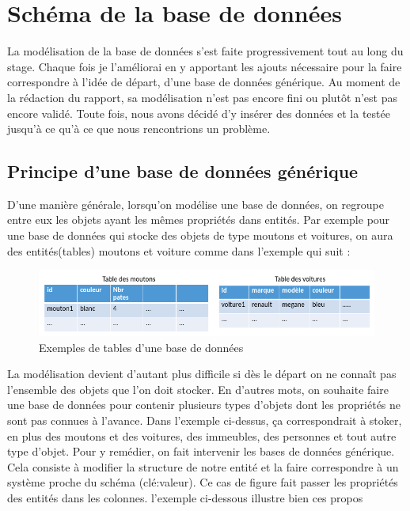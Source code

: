 \section{Schéma de la base de données}
La modélisation de la base de données s'est faite progressivement tout au long du stage. Chaque fois je l'améliorai en y apportant les ajouts nécessaire pour la faire correspondre à l'idée de départ, d'une base de données générique. Au moment de la rédaction du rapport, sa modélisation n'est pas encore fini ou plutôt n'est pas encore validé. Toute fois, nous avons décidé d'y insérer des données et la testée jusqu'à ce qu'à ce que nous rencontrions un problème.
\subsection{Principe d'une base de données générique}
D'une manière générale, lorsqu'on modélise une base de données, on regroupe entre eux les objets ayant les mêmes propriétés dans entités. Par exemple pour une base de données qui stocke des objets de type moutons et voitures, on aura des entités(tables) moutons et voiture comme dans l'exemple qui suit : 

\begin{figure}[h!]
\begin{center}
\includegraphics[width=1\textwidth]{images/bd_image1.png}
\end{center}
\caption{Exemples de tables d'une base de données}
\label{fig : Exemples de tables d'une base de données}
\end{figure}

La modélisation devient d'autant plus difficile si dès le départ on ne connaît pas l'ensemble des objets que l'on doit stocker. En d'autres mots, on souhaite faire une base de données pour contenir plusieurs types d'objets dont les propriétés ne sont pas connues à l'avance. Dans l'exemple ci-dessus, ça correspondrait à stoker, en plus des moutons et des voitures, des immeubles, des personnes et tout autre type d'objet. Pour y remédier, on fait intervenir les bases de données générique. Cela consiste à modifier la structure de notre entité et la faire correspondre à un système proche du schéma (clé:valeur). Ce cas de figure fait passer les propriétés des entités dans les colonnes.
l'exemple ci-dessous illustre bien ces propos

